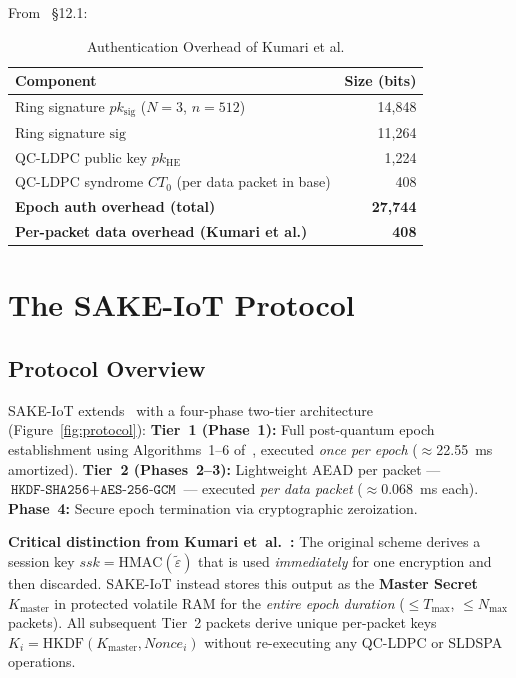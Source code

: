 \documentclass[conference]{IEEEtran}
\newcommand{\GCM}{\texttt{AES-256-GCM}}
\newcommand{\HKDF}{\texttt{HKDF-SHA256}}
\newcommand{\Kmaster}{K_{\mathrm{master}}}
\newcommand{\Nmax}{N_{\max}}
\newcommand{\Tmax}{T_{\max}}
\begin{document}
From~\cite{kumari2022} \S12.1:

\begin{table}[!t]
\centering
\caption{Authentication Overhead of Kumari et al.}
\label{tab:baseoverhead}
\begin{tabular}{lr}
\toprule
\textbf{Component} & \textbf{Size (bits)} \\
\midrule
Ring signature $pk_{\mathrm{sig}}$ ($N=3$, $n=512$) & 14,848 \\
Ring signature $\mathrm{sig}$ & 11,264 \\
QC-LDPC public key $pk_{\mathrm{HE}}$ & 1,224 \\
QC-LDPC syndrome $CT_0$ (per data packet in base) & 408 \\
\midrule
\textbf{Epoch auth overhead (total)} & \textbf{27,744} \\
\textbf{Per-packet data overhead (Kumari et al.)} & \textbf{408} \\
\bottomrule
\end{tabular}
\end{table}

\section{The SAKE-IoT Protocol}
\label{sec:protocol}

\subsection{Protocol Overview}

SAKE-IoT extends~\cite{kumari2022} with a four-phase two-tier architecture
(Figure~\ref{fig:protocol}):
\textbf{Tier~1 (Phase~1):} Full post-quantum epoch establishment using
Algorithms~1--6 of~\cite{kumari2022}, executed \emph{once per epoch}
($\approx$22.55~ms amortized).
\textbf{Tier~2 (Phases~2--3):} Lightweight AEAD per packet ---
$\HKDF{} + \GCM{}$ --- executed \emph{per data packet}
($\approx$0.068~ms each).
\textbf{Phase~4:} Secure epoch termination via cryptographic zeroization.

\noindent\textbf{Critical distinction from Kumari et~al.~\cite{kumari2022}:}
The original scheme derives a session key $\mathit{ssk} = \mathrm{HMAC}(\tilde{\varepsilon})$
that is used \emph{immediately} for one encryption and then discarded.
SAKE-IoT instead stores this output as the \textbf{Master Secret} $\Kmaster$
in protected volatile RAM for the \emph{entire epoch duration} ($\leq \Tmax$,
$\leq \Nmax$ packets). All subsequent Tier~2 packets derive unique
per-packet keys $K_i = \mathrm{HKDF}(\Kmaster, \mathit{Nonce}_i)$ without
re-executing any QC-LDPC or SLDSPA operations.
\end{document}
